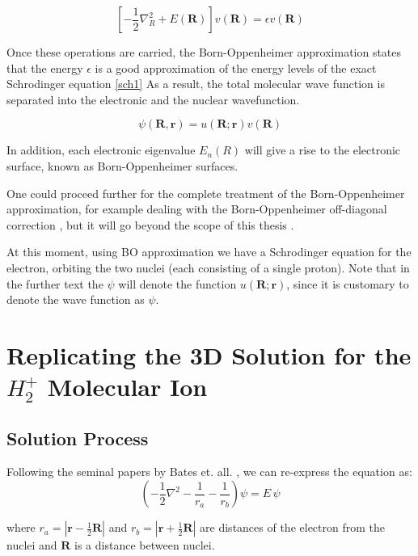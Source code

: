\begin{equation}\label{v}
\left[ -\frac{1}{2}\nabla_R^2 + E(\mathbf{R}) \right] v( \mathbf{R} ) = \epsilon  v( \mathbf{R} )
\end{equation}

Once these operations are carried, the Born-Oppenheimer approximation states that the energy $ \epsilon $ is a good approximation of the energy levels of the exact Schrodinger equation \eqref{sch1}
 As a result, the total molecular wave function is separated into the electronic and the nuclear wavefunction.

\begin{equation}
\psi(\mathbf{R},\mathbf{r}) =  u(\mathbf{R};\mathbf{r})  v( \mathbf{R} )
\end{equation}

In addition, each electronic eigenvalue $ E_n(R) $ will give a rise to the electronic surface, known as Born-Oppenheimer surfaces. 

One could proceed further for the complete treatment of the Born-Oppenheimer approximation, for example dealing with the Born-Oppenheimer off-diagonal correction \cite{BOApprox2}, but it will go beyond the scope of this thesis . 

At this moment, using BO approximation we have a Schrodinger equation for the electron, orbiting the two nuclei (each consisting of a single proton). Note that in the further text the $ \psi $ will denote the function $  u(\mathbf{R}; \mathbf{r} ) $, since it is customary to denote the wave function as $ \psi $. 

\section{Replicating the 3D Solution for the \texorpdfstring{$ H_2^{+} $}{ $H_2^+ $ } Molecular Ion }

\subsection{Solution Process}

Following the seminal papers by Bates et. all.  \cite{Bates1}\cite{Bates2}, we can re-express the equation  as:
\begin{equation}\label{eqPartial3D}
\left(-\frac{1}{2}\nabla^2-\frac{1}{r_a}-\frac{1}{r_b}\right)\psi = E\,\psi
\end{equation}

where $ r_a = \left|\mathbf{r}-\frac{1}{2}\mathbf{R}\right| $ and $ r_b = \left|\mathbf{r}+\frac{1}{2}\mathbf{R}\right| $ are distances of the electron from the nuclei and $ \mathbf{R} $ is a distance between nuclei.

